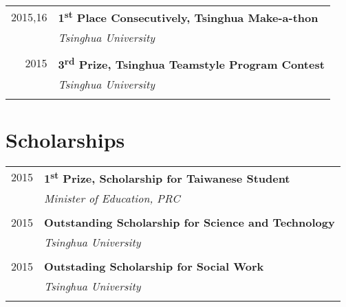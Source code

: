 \documentclass[10pt]{article} %
\begin{document}
{\begin{minipage}[t]{0.5\textwidth}
\begin{tabular}{rl}
2015,16	 & \textbf{1\textsuperscript{st} Place Consecutively, Tsinghua Make-a-thon}\\
& \textit{Tsinghua University}\\ \\

2015	 & \textbf{3\textsuperscript{rd} Prize, Tsinghua Teamstyle Program Contest}\\
& \textit{Tsinghua University}\\ \\

\end{tabular}


\section{Scholarships} 

\begin{tabular}{rl}

2015	 & \textbf{1\textsuperscript{st} Prize, Scholarship for Taiwanese Student}\\
& \textit{Minister of Education, PRC}\\ \\

2015	 & \textbf{Outstanding Scholarship for Science and Technology}\\
& \textit{Tsinghua University}\\ \\

2015	 & \textbf{Outstading Scholarship for Social Work}\\
& \textit{Tsinghua University}\\ \\

\end{tabular}


\end{minipage} %
\hfill
\begin{minipage}[t]{0.44\textwidth} %
\vspace{0pt} %


\end{minipage}}
\end{document}
